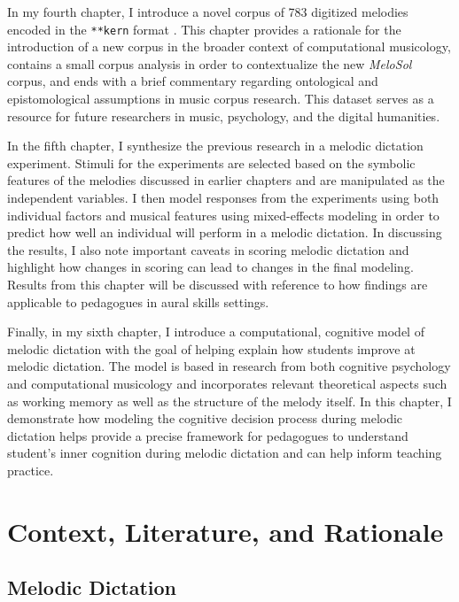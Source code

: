 \documentclass[12pt,]{book}
\begin{document}
In my fourth chapter, I introduce a novel corpus of 783 digitized melodies encoded in the \texttt{**kern}
format \citep{huronHumdrumToolkitReference1994}.
This chapter provides a rationale for the introduction of a new corpus in the broader context of computational musicology, contains a small corpus analysis in order to contextualize the new \emph{MeloSol} corpus, and ends with a brief commentary regarding ontological and epistomological assumptions in music corpus research.
This dataset serves as a resource for future researchers in music, psychology, and the digital humanities.

In the fifth chapter, I synthesize the previous research in a melodic dictation experiment.
Stimuli for the experiments are selected based on the symbolic features of the melodies discussed in earlier chapters and are manipulated as the independent variables.
I then model responses from the experiments using both individual factors and musical features using mixed-effects modeling in order to predict how well an individual will perform in a melodic dictation.
In discussing the results, I also note important caveats in scoring melodic dictation and highlight how changes in scoring can lead to changes in the final modeling.
Results from this chapter will be discussed with reference to how findings are applicable to pedagogues in aural skills settings.

Finally, in my sixth chapter, I introduce a computational, cognitive model of melodic dictation with the goal of helping explain how students improve at melodic dictation.
The model is based in research from both cognitive psychology \citep{cowanMagicalMysteryFour2010} and computational musicology \citep{pearceStatisticalLearningProbabilistic2018a} and incorporates relevant theoretical aspects such as working memory \citep{chenetteReframingAuralSkills2019, vanhandelRoleWorkingMemory2011} as well as the structure of the melody itself.
In this chapter, I demonstrate how modeling the cognitive decision process during melodic dictation helps provide a precise framework for pedagogues to understand student's inner cognition during melodic dictation and can help inform teaching practice.

\hypertarget{intro}{%
\chapter{Context, Literature, and Rationale}\label{intro}}

\hypertarget{melodic-dictation}{%
\section{Melodic Dictation}\label{melodic-dictation}}
\end{document}
